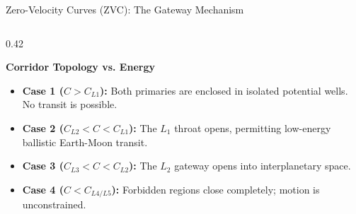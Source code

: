 \documentclass[aspectratio=169, 10pt]{beamer}
\begin{document}
\begin{frame}{Zero-Velocity Curves (ZVC): The Gateway Mechanism}
\begin{columns}[t]
        \begin{column}{0.42\textwidth}
            \begin{block}{\textbf{Corridor Topology vs. Energy}}
                \scriptsize
                \begin{itemize}\setlength{\itemsep}{2pt}
                    \item \textbf{Case 1 ($C > C_{L1}$):} Both primaries are enclosed in isolated potential wells. No transit is possible.
                    \item \textbf{Case 2 ($C_{L2} < C < C_{L1}$):} The $L_1$ throat opens, permitting low-energy ballistic Earth-Moon transit.
                    \item \textbf{Case 3 ($C_{L3} < C < C_{L2}$):} The $L_2$ gateway opens into interplanetary space.
                    \item \textbf{Case 4 ($C < C_{L4/L5}$):} Forbidden regions close completely; motion is unconstrained.
                \end{itemize}
            \end{block}
        \end{column}
    \end{columns}
\end{frame}
\end{document}

